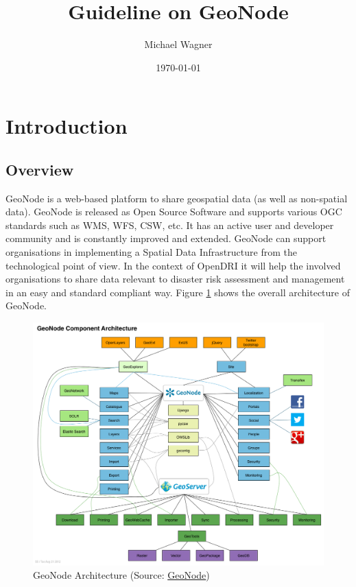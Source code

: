 \documentclass[a4paper,12pt,titlepage]{article}
\title{Guideline on GeoNode}
\author{Michael Wagner}
\date{\today}
\begin{document}
             										
\maketitle                   									

\tableofcontents
\listoffigures
\newpage

\section{Introduction}

\subsection{Overview}

GeoNode is a web-based platform to share geospatial data (as well as non-spatial data). GeoNode is released as Open Source Software and supports various OGC standards such as WMS, WFS, CSW, etc. It has an active user and developer community and is constantly improved and extended. GeoNode can support organisations in implementing a Spatial Data Infrastructure from the technological point of view. In the context of OpenDRI it will help the involved organisations to share data relevant to disaster risk assessment and management in an easy and standard compliant way. Figure \ref{fig:geonode_architecture} shows the overall architecture of GeoNode.

\begin{figure}[H]
	\centering
	\includegraphics[width=12cm]{Images/geonode_architecture.png}
	\caption[GeoNode Architecture]{GeoNode Architecture (Source: \href{http://docs.geonode.org/en/master/tutorials/overview_and_ref/reference_doc/architecture.html}{GeoNode})}\label{fig:geonode_architecture}
\end{figure}
\end{document}
